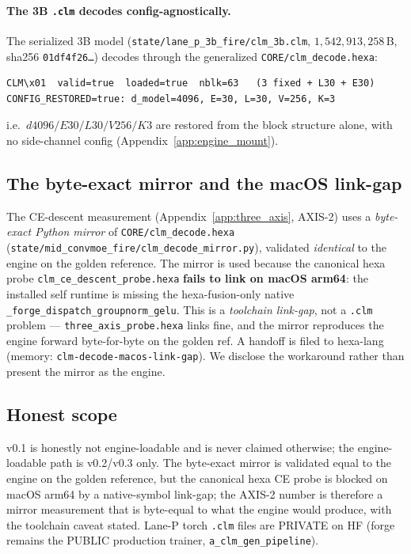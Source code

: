 \paragraph{The 3B \texttt{.clm} decodes config-agnostically.} The serialized 3B
model (\texttt{state/lane\_p\_3b\_fire/clm\_3b.clm}, $1{,}542{,}913{,}258$\,B,
sha256 \texttt{01df4f26\dots}) decodes through the generalized
\texttt{CORE/clm\_decode.hexa}:
\begin{verbatim}
CLM\x01  valid=true  loaded=true  nblk=63   (3 fixed + L30 + E30)
CONFIG_RESTORED=true: d_model=4096, E=30, L=30, V=256, K=3
\end{verbatim}
i.e.\ $d4096/E30/L30/V256/K3$ are restored from the block structure alone, with
no side-channel config (Appendix~\ref{app:engine_mount}).

\subsection{The byte-exact mirror and the macOS link-gap}
\label{app:clm-mirror}

The CE-descent measurement (Appendix~\ref{app:three_axis}, AXIS-2) uses a
\emph{byte-exact Python mirror} of \texttt{CORE/clm\_decode.hexa}
(\texttt{state/mid\_convmoe\_fire/clm\_decode\_mirror.py}), validated
\emph{identical} to the engine on the golden reference. The mirror is used because
the canonical hexa probe \texttt{clm\_ce\_descent\_probe.hexa}
\textbf{fails to link on macOS arm64}: the installed self runtime is missing the
hexa-fusion-only native \texttt{\_forge\_dispatch\_groupnorm\_gelu}. This is a
\emph{toolchain link-gap}, not a \texttt{.clm} problem --- \texttt{three\_axis\_probe.hexa}
links fine, and the mirror reproduces the engine forward byte-for-byte on the
golden ref. A handoff is filed to hexa-lang (memory: \texttt{clm-decode-macos-link-gap}).
We disclose the workaround rather than present the mirror as the engine.

\subsection{Honest scope}
\label{app:clm-scope}

v0.1 is honestly not engine-loadable and is never claimed otherwise; the
engine-loadable path is v0.2/v0.3 only. The byte-exact mirror is validated equal
to the engine on the golden reference, but the canonical hexa CE probe is blocked
on macOS arm64 by a native-symbol link-gap; the AXIS-2 number is therefore a
mirror measurement that is byte-equal to what the engine would produce, with the
toolchain caveat stated. Lane-P torch \texttt{.clm} files are PRIVATE on HF
(forge remains the PUBLIC production trainer, \texttt{a\_clm\_gen\_pipeline}).
